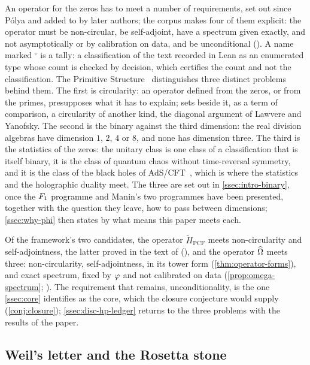 An operator for the zeros has to meet a number of requirements, set out since P\'olya and added to by later authors;
the corpus makes four of them explicit: the operator must be non-circular, be self-adjoint, have a spectrum given
exactly, and not asymptotically or by calibration on data, and be unconditional ().  A name marked $^{\circ}$ is a tally: a
classification of the text recorded in Lean as an enumerated type whose count is checked by decision,
which certifies the count and not the classification.
The Primitive Structure~\cite{gonzalez25hp} distinguishes three distinct problems behind them.  The first is
circularity: an operator defined from the zeros, or from the primes, presupposes what it has to explain;
\cite{gonzalez25hp} sets beside it, as a term of comparison, a circularity of another kind, the diagonal argument of
Lawvere and Yanofsky.  The second is the binary against the third dimension: the real division algebras have
dimension $1$, $2$, $4$ or $8$, and none has dimension three.  The third is the statistics of the zeros: the unitary
class is one class of a classification that is itself binary, it is the class of quantum chaos without
time-reversal symmetry, and it is the class of the black holes of AdS/CFT~\cite{cotler17}, which is where the
statistics and the holographic duality meet.  The three are set out in \cref{ssec:intro-binary}, once the $F_1$
programme and Manin's two programmes have been presented, together with the question they leave, how to pass
between dimensions; \cref{ssec:why-phi} then states by what means this paper meets each.

Of the framework's two candidates, the operator $\tilde H_{\mathrm{PCF}}$
meets non-circularity and self-adjointness, the latter proved in the text of \cite{gonzalez25hp}
(), and the operator $\widehat{\Omega}$ meets three: non-circularity, self-adjointness, in its
tower form (\cref{thm:operator-forms}), and exact spectrum, fixed by $\varphi$ and not calibrated on data
(\cref{prop:omega-spectrum}; ).  The requirement that remains, unconditionality, is
the one \cref{ssec:core} identifies as the core, which the closure conjecture would supply (\cref{conj:closure});
\cref{ssec:disc-hp-ledger} returns to the three problems with the results of the paper.

\subsection{Weil's letter and the Rosetta stone}\label{sec:weil}

